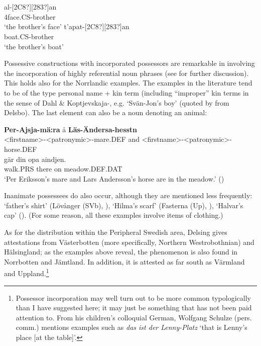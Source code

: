 \ea
{}\\
\ea
{}\\
\gll [127?]al-[2C8?][283?]an\\
4face.CS-brother\\
\glt ‘the brother’s face’  
\ex
{}
\gll t’apat-[2C8?][283?]an\\
boat.CS-brother\\
\glt ‘the brother’s boat’
\z
\z

Possessive constructions with incorporated possessors are remarkable in involving the incorporation of highly referential noun phrases (see \citet{Dahl2004} for further discussion). This holds also for the Norrlandic examples. The examples in the literature tend to be of the type personal name + kin term (including “improper” kin terms in the sense of Dahl \& Koptjevskaja-\citet{Tamm2001}, e.g.  ‘Svän-Jon’s boy’ (quoted by \citet[38]{Delsing2003a} from Delsbo). The last element can also be a noun denoting an animal:

\ea\label{}
\gll \textbf{Per-Ajsja-mä:ra} å  \textbf{Läs-Ändersa-hesstn}\\
{\textless}firstname{\textgreater}-{\textless}patronymic{\textgreater}-mare.DEF  and  {\textless}firstname{\textgreater}-{\textless}patronymic{\textgreater}-horse.DEF\\
\gll gär  din  opa  aindjen.\\
walk.PRS  there  on  meadow.DEF.DAT\\
\glt ‘Per Eriksson’s mare and Lars Andersson’s horse are in the meadow.’ (\citet[164]{Källskog1992})
\z

Inanimate possessees do also occur, although they are mentioned less frequently:  ‘father’s shirt’ (Lövånger (SVb), \citet{Holm1942}),  ‘Hilma’s scarf’ (Fasterna (Up), \citet[134]{Tiselius1902}),  ‘Halvar’s cap’ (\citet{Oscarsson2007}). (For some reason, all these examples involve items of clothing.)

As for the distribution within the Peripheral Swedish area, Delsing gives attestations from Västerbotten (more specifically, Northern Westrobothnian) and Hälsingland; as the examples above reveal, the phenomenon is also found in Norrbotten and Jämtland. In addition, it is attested as far south as Värmland and Uppland.\footnote{ Possessor incorporation may well turn out to be more common typologically than I have suggested here; it may just be something that has not been paid attention to. From his children’s colloquial German, Wolfgang Schulze (pers. comm.) mentions examples such as \textit{das ist der Lenny-Platz} ‘that is Lenny’s place [at the table]’.\par }

